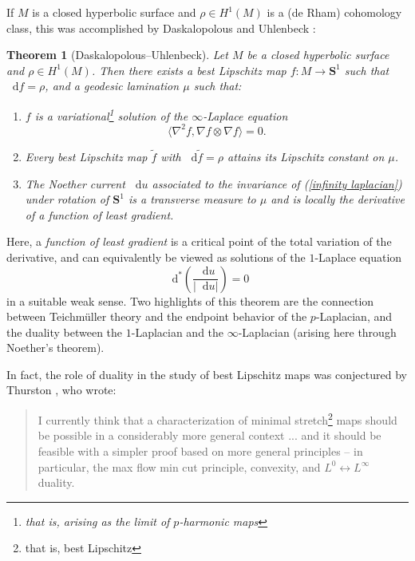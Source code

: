 \documentclass[reqno,11pt]{amsart}
\newcommand{\Sph}{\mathbf S}
\newcommand*\dif{\mathop{}\!\mathrm{d}}
\newcommand{\dfn}[1]{\emph{#1}\index{#1}}
\newtheorem{theorem}{Theorem}[section]
\theoremstyle{definition}
\numberwithin{equation}{section}
\begin{document}
If $M$ is a closed hyperbolic surface and $\rho \in H^1(M)$ is a (de Rham) cohomology class, this was accomplished by Daskalopolous and Uhlenbeck \cite{daskalopoulos2020transverse}:

\begin{theorem}[Daskalopolous--Uhlenbeck]\label{DU20}
Let $M$ be a closed hyperbolic surface and $\rho \in H^1(M)$.
Then there exists a best Lipschitz map $f: M \to \Sph^1$ such that $\dif f = \rho$, and a geodesic lamination $\mu$ such that:
\begin{enumerate}
\item $f$ is a variational\footnote{that is, arising as the limit of $p$-harmonic maps} solution of the $\infty$-Laplace equation
\begin{equation}\label{infinity laplacian}
	\langle \nabla^2 f, \nabla f \otimes \nabla f\rangle = 0.
\end{equation}
\item Every best Lipschitz map $\tilde f$ with $\dif \tilde f = \rho$ attains its Lipschitz constant on $\mu$.
\item The Noether current $\dif u$ associated to the invariance of (\ref{infinity laplacian}) under rotation of $\Sph^1$ is a transverse measure to $\mu$ and is locally the derivative of a function of least gradient.
\end{enumerate}
\end{theorem}

Here, a \dfn{function of least gradient} is a critical point of the total variation of the derivative, and can equivalently be viewed as solutions of the $1$-Laplace equation
$$\dif^* \left(\frac{\dif u}{|\dif u|}\right) = 0$$
in a suitable weak sense.
Two highlights of this theorem are the connection between Teichm\"uller theory and the endpoint behavior of the $p$-Laplacian, and the duality between the $1$-Laplacian and the $\infty$-Laplacian (arising here through Noether's theorem).

In fact, the role of duality in the study of best Lipschitz maps was conjectured by Thurston \cite[Abstract]{Thurston98}, who wrote:

\begin{quote}
I currently think that a characterization of minimal stretch\footnote{that is, best Lipschitz} maps should be possible in a considerably more general context ... and it should be feasible with a simpler proof based on more general principles -- in particular, the max flow min cut principle, convexity, and $L^0 \leftrightarrow L^\infty$ duality.
\end{quote}
\end{document}
